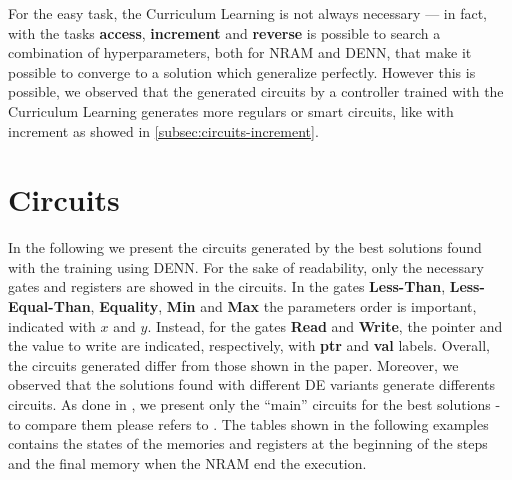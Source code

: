 For the easy task, the Curriculum Learning is not always necessary --- in fact, with the tasks \textbf{access}, \textbf{increment} and \textbf{reverse} is possible to search a combination of hyperparameters, both for NRAM and DENN, that make it possible to converge to a solution which generalize perfectly. However this is possible, we observed that the  generated circuits by a controller trained with the Curriculum Learning generates more regulars or smart circuits, like with increment as showed in \ref{subsec:circuits-increment}. 


\section{Circuits}\label{subsec:circuits}
In the following we present the circuits generated by the best solutions found with  the training using DENN. For the sake of readability, only the necessary gates and registers are showed in the circuits. In the gates \textbf{Less-Than}, \textbf{Less-Equal-Than}, \textbf{Equality}, \textbf{Min} and \textbf{Max} the parameters order is important, indicated with $x$ and $y$. Instead, for the gates \textbf{Read} and \textbf{Write}, the pointer and the value to write are indicated, respectively, with \textbf{ptr} and \textbf{val} labels.\newline\newline
Overall, the circuits generated differ from those shown in the paper. Moreover, we observed that the solutions found with different DE variants generate differents circuits. As done in \cite{NRAM:2016}, we present only the ``main'' circuits for the best solutions - to compare them please refers to \cite{NRAM:2016}. The tables shown in the following examples contains the states of the memories and registers at the beginning of the steps and the final memory when the NRAM end the execution.
\clearpage
